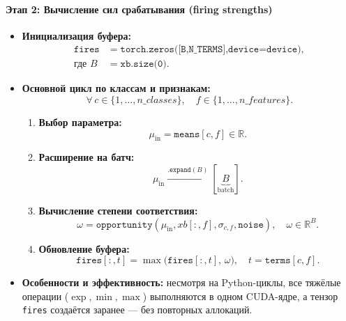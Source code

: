 \paragraph{Этап 2: Вычисление сил срабатывания (firing strengths)}  
\begin{itemize}
  \item {\bf Инициализация буфера:}
  \[
    \begin{split}
      \texttt{fires}
      &= \texttt{torch.zeros([B,N\_TERMS],device=device)}, \\
      \text{где }B &= \texttt{xb.size(0)}.
    \end{split}
  \]
  \item {\bf Основной цикл по классам и признакам:}
    \[
      \forall\,c\in\{1,\dots,n\_classes\},\quad
      f\in\{1,\dots,n\_features\}.
    \]
    \begin{enumerate}
      \item {\bf Выбор параметра:}
        \[
          \mu_{\text{in}} = \texttt{means}[c,f]\in\mathbb{R}.
        \]
      \item {\bf Расширение на батч:}
        \[
          \mu_{\text{in}}
          \xrightarrow{\texttt{.expand}(B)}
          [\underbrace{B}_{\text{batch}}].
        \]
      \item {\bf Вычисление степени соответствия:}
        \[
          \omega
          = \texttt{opportunity}(
              \mu_{\text{in}},
              xb[:,f],
              \sigma_{c,f},
              \texttt{noise}
            ),
          \quad \omega\in\mathbb{R}^B.
        \]
      \item {\bf Обновление буфера:}
        \[
          \texttt{fires}[:,t]
          = \max\bigl(\texttt{fires}[:,t],\,\omega\bigr),
          \quad t = \texttt{terms}[c,f].
        \]
    \end{enumerate}
  \item {\bf Особенности и эффективность:}  
    несмотря на Python-циклы, все тяжёлые операции (\(\exp,\min,\max\)) выполняются в одном CUDA-ядре,  
    а тензор \texttt{fires} создаётся заранее — без повторных аллокаций.
\end{itemize}

